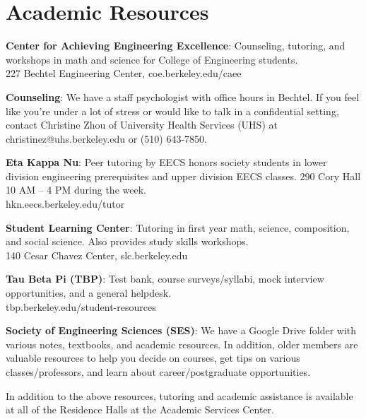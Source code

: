 \chapter*{Academic Resources}

\textbf{Center for Achieving Engineering Excellence}: Counseling, tutoring, and workshops in math and science for College of Engineering students. \\
227 Bechtel Engineering Center, {\selectfont coe.berkeley.edu/caee} 

\textbf{Counseling}: We have a staff psychologist with office hours in Bechtel. If you feel like you’re under a lot of stress or would like to talk in a confidential setting, contact Christine Zhou of University Health Services (UHS) at {\selectfont christinez@uhs.berkeley.edu} or (510) 643-7850.

\textbf{Eta Kappa Nu}: Peer tutoring by EECS honors society students in lower division engineering prerequisites and upper division EECS classes. 290 Cory Hall 10 AM – 4 PM during the week. \\
{\selectfont hkn.eecs.berkeley.edu/tutor} 

\textbf{Student Learning Center}: Tutoring in first year math, science, composition, and social science. Also provides study skills workshops. \\
140 Cesar Chavez Center, {\selectfont slc.berkeley.edu}

\textbf{Tau Beta Pi (TBP)}: Test bank, course surveys/syllabi, mock interview opportunities, and a general helpdesk. \\
{\selectfont tbp.berkeley.edu/student-resources}

\textbf{Society of Engineering Sciences (SES)}: We have a Google Drive folder with various notes, textbooks, and academic resources. In addition, older members are valuable resources to help you decide on courses, get tips on various classes/professors, and learn about career/postgraduate opportunities.

In addition to the above resources, tutoring and academic assistance is available at all of the Residence Halls at the Academic Services Center.

